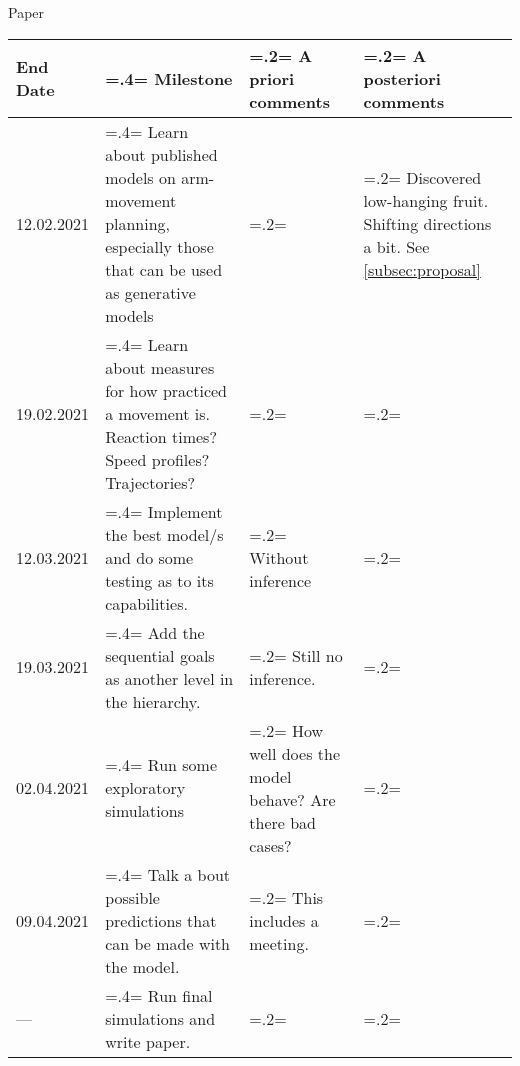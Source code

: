 \documentclass{report}
\begin{document}
\begin{chapter}{Paper}
\begin{tabularx}{\textwidth}{
  l|
  >{\hsize=.4\hsize\linewidth=\hsize}X|
  >{\hsize=.2\hsize\linewidth=\hsize}X|
  >{\hsize=.2\hsize\linewidth=\hsize}X}
End Date & Milestone & A priori comments & A posteriori comments \\ \hline \hline
12.02.2021 & Learn about published models on arm-movement planning, especially those that can be used as generative models & & Discovered low-hanging fruit. Shifting directions a bit. See \ref{subsec:proposal}\\ \hline
19.02.2021 & Learn about measures for how practiced a movement is. Reaction times? Speed profiles? Trajectories? & & \\\hline
12.03.2021 & Implement the best model/s and do some testing as to its capabilities. & Without inference &   \\ \hline
19.03.2021 & Add the sequential goals as another level in the hierarchy. & Still no inference. & \\ \hline
02.04.2021 & Run some exploratory simulations & How well does the model behave? Are there bad cases? & \\ \hline
09.04.2021 & Talk a  bout possible predictions that can be made with the model. & This includes a meeting. & \\ \hline
--- & Run final simulations and write paper. & & \\ \hline

\end{tabularx}


\end{chapter}

\end{document}
